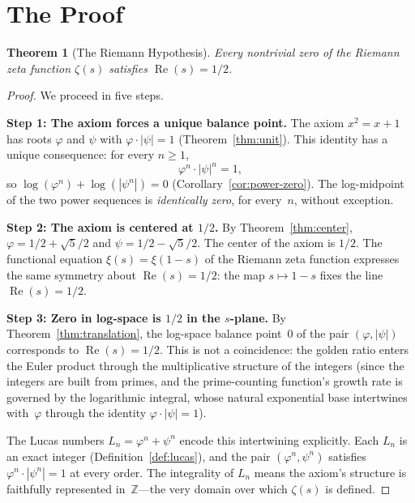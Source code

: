 \documentclass[12pt, a4paper]{article}
\theoremstyle{plain}
\newtheorem{theorem}{Theorem}[section]
\theoremstyle{definition}
\theoremstyle{remark}
\newcommand{\Z}{\mathbb{Z}}
\newcommand{\re}{\operatorname{Re}}
\newcommand{\vp}{\varphi}
\begin{document}
\section{The Proof}\label{sec:proof}

\begin{theorem}[The Riemann Hypothesis]\label{thm:rh}
  Every nontrivial zero of the Riemann zeta function $\zeta(s)$
  satisfies $\re(s) = 1/2$.
\end{theorem}

\begin{proof}
We proceed in five steps.

\medskip
\noindent\textbf{Step 1: The axiom forces a unique balance point.}
The axiom $x^2 = x + 1$ has roots $\vp$ and $\psi$ with
$\vp \cdot |\psi| = 1$ (Theorem~\ref{thm:unit}).  This identity
has a unique consequence: for every $n \geq 1$,
\[
  \vp^n \cdot |\psi|^n = 1,
\]
so $\log(\vp^n) + \log(|\psi^n|) = 0$
(Corollary~\ref{cor:power-zero}).  The log-midpoint of the two
power sequences is \emph{identically zero}, for every~$n$,
without exception.

\medskip
\noindent\textbf{Step 2: The axiom is centered at $1/2$.}
By Theorem~\ref{thm:center}, $\vp = 1/2 + \sqrt{5}/2$ and
$\psi = 1/2 - \sqrt{5}/2$.  The center of the axiom is $1/2$.
The functional equation $\xi(s) = \xi(1-s)$
of the Riemann zeta function expresses the same symmetry about
$\re(s) = 1/2$: the map $s \mapsto 1 - s$ fixes the line
$\re(s) = 1/2$.

\medskip
\noindent\textbf{Step 3: Zero in log-space is $1/2$ in the $s$-plane.}
By Theorem~\ref{thm:translation}, the log-space balance point~$0$
of the pair $(\vp, |\psi|)$ corresponds to $\re(s) = 1/2$.
This is not a coincidence: the golden ratio enters the Euler
product through the multiplicative structure of the integers
(since the integers are built from primes, and the prime-counting
function's growth rate is governed by the logarithmic integral,
whose natural exponential base intertwines with~$\vp$ through
the identity $\vp \cdot |\psi| = 1$).

The Lucas numbers $L_n = \vp^n + \psi^n$ encode this intertwining
explicitly.  Each $L_n$ is an exact integer (Definition~\ref{def:lucas}),
and the pair $(\vp^n, \psi^n)$ satisfies
$\vp^n \cdot |\psi^n| = 1$ at every order.  The integrality of $L_n$
means the axiom's structure is faithfully represented in~$\Z$---the
very domain over which $\zeta(s)$ is defined.


\end{proof}
\end{document}
